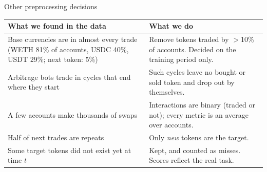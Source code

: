 \documentclass[aspectratio=169,10pt]{beamer}
\begin{document}
\begin{frame}{Other preprocessing decisions \hfill \done}
  \small
  \renewcommand{\arraystretch}{1.3}
  \begin{tabularx}{\textwidth}{@{}>{\raggedright\arraybackslash}p{5.2cm}>{\raggedright\arraybackslash}X@{}}
    \toprule
    What we found in the data & What we do \\
    \midrule
    Base currencies are in almost every trade (WETH 81\% of accounts, USDC 40\%, USDT 29\%; next token: 5\%) & Remove tokens traded by $>$10\% of accounts. Decided on the training period only. \\
    Arbitrage bots trade in cycles that end where they start & Such cycles leave no bought or sold token and drop out by themselves. \\
    A few accounts make thousands of swaps & Interactions are binary (traded or not); every metric is an average over accounts. \\
    Half of next trades are repeats & Only \emph{new} tokens are the target. \\
    Some target tokens did not exist yet at time $t$ & Kept, and counted as misses. Scores reflect the real task. \\
    \bottomrule
  \end{tabularx}
\end{frame}
\end{document}
